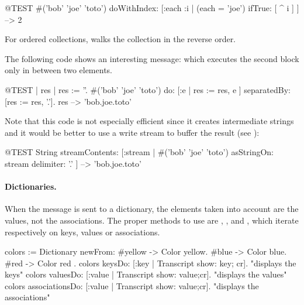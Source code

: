 \documentclass[a4paper,10pt,twoside]{book}
\begin{document}
\begin{code}{@TEST}
#('bob' 'joe' 'toto') doWithIndex: [:each :i | (each = 'joe') ifTrue: [ ^ i ] ] --> 2
\end{code}

For ordered collections,  walks the collection in the reverse order. 

The following code shows an interesting message:  which 
executes the second block only in between two elements.
\begin{code}{@TEST | res | }
res := ''.
#('bob' 'joe' 'toto') do: [:e | res := res, e ] separatedBy: [res := res, '.'].
res --> 'bob.joe.toto'
\end{code}
\noindent
Note that this code is not especially efficient since it creates intermediate strings and it would be better to use a write stream to buffer the result (see ):
\begin{code}{@TEST}
String streamContents: [:stream | #('bob' 'joe' 'toto') asStringOn: stream delimiter: '.' ] --> 'bob.joe.toto'
\end{code}



\paragraph{Dictionaries.}
When the message  is sent to a dictionary, the elements taken into account are the values, not the associations. The proper methods to use are , , and , which iterate respectively on keys, values or associations.

\begin{code}{}
colors := Dictionary newFrom: { #yellow -> Color yellow. #blue -> Color blue. #red -> Color red }.
colors keysDo: [:key | Transcript show: key; cr].                    "displays the keys"
colors valuesDo: [:value | Transcript show: value;cr].            "displays the values"
colors associationsDo: [:value | Transcript show: value;cr].  "displays the associations"
\end{code}
\end{document}
